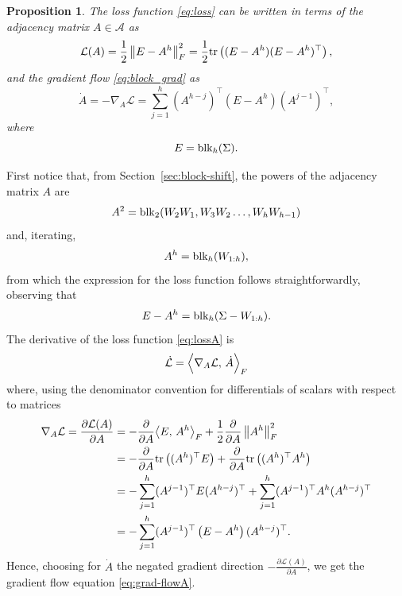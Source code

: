 \documentclass{article}
\makeatletter
\renewenvironment{proof}[1][\proofname]{
  \par\pushQED{\qed}\normalfont
  \topsep6\p@\@plus6\p@\relax
  \trivlist\item[\hskip\labelsep\bfseries#1\@addpunct{.}]
  \ignorespaces
}{
  \popQED\endtrivlist\@endpefalse
}
\newtheorem{proposition}{Proposition}
\def\tr{{\rm tr}}
\def\block{{\rm blk}}
\newcommand{\1}{\mathds{1}}
\newcommand{\beq}{\begin{equation}}
\newcommand{\eeq}{\end{equation}}
\makeatother
\begin{document}
\begin{proposition}\label{prop:grad-A}
The loss function \eqref{eq:loss} can be written in terms of the adjacency matrix $ A \in \mathcal{A}$ as
\begin{equation}
\mathcal{L}(A) = \frac{1}{2} \left\| E- A^h \right\|_F^2 =  \frac{1}{2}  \tr\left( (E-A^h)(E-A^h)^\top \right),
\label{eq:lossA}
\end{equation}
and the gradient flow \eqref{eq:block_grad} as
\begin{equation}
	\dot{A}= - \nabla_A \mathcal{L} = \sum_{j=1}^h \left(A^{h-j}\right)^\top \left( E - A^h \right) \left( A^{j-1}
 \right) ^\top,
 \label{eq:grad-flowA}
\end{equation}
where 
\[
E= \block_h (\Sigma ) .
 \]    
\end{proposition}
 
\begin{proof}
First notice that, from Section~\ref{sec:block-shift}, the powers of the adjacency matrix $A$ are 
\[\label{eq:A2_Ak}
	A^2=\block_2(W_2 W_1, W_3 W_2 \ldots, W_h W_{h-1} )  
 \]
 and, iterating, 
 \beq
 \label{eq:Apowerh}
    A^h=\block_h (W_{1:h}) ,
\eeq
from which the expression for the loss function follows straightforwardly, observing that
\begin{equation*}
	E - A^{h}= \block_h ( \Sigma-W_{1:h} ).
\end{equation*}
The derivative of the loss function \eqref{eq:lossA} is
\begin{equation}
\label{eq:dotL}
\dot{\mathcal{L}}= 
\Bigl \langle \nabla_A \mathcal{L}  ,\,  \dot A \Bigr \rangle_F 
\end{equation}
where, using the denominator convention for differentials of scalars with respect to matrices \cite{Petersen2012matrix}
\begin{align*}
\nabla_A \mathcal{L}  = \frac{\partial \mathcal{L}(A) }{\partial A} & = 
- \frac{\partial }{\partial A} \bigl \langle E, \, A^h \bigr \rangle _F + \frac{1}{2} \frac{\partial }{\partial A} \left\| A^h \right\|_F^2 \\
& = -  \frac{\partial  }{\partial A} \tr\left( (A^h)^\top E \right) +  \frac{\partial  } {\partial A} \tr \left((A^h)^\top A^h \right)  \\
& = - \sum_{j=1}^h (A^{j-1})^\top  E (A^{h-j} )^\top
+  \sum_{j=1}^h (A^{j-1})^\top A^h (A^{h-j})^\top \\
& = - \sum_{j=1}^h (A^{j-1})^\top \left( E - A^h \right)( A^{h-j})^\top.
\end{align*}
Hence, choosing for $ \dot A$ the negated gradient direction $ - \frac{\partial \mathcal{L}(A) }{\partial A}  $, we get the gradient flow equation \eqref{eq:grad-flowA}.
\end{proof}
\end{document}
